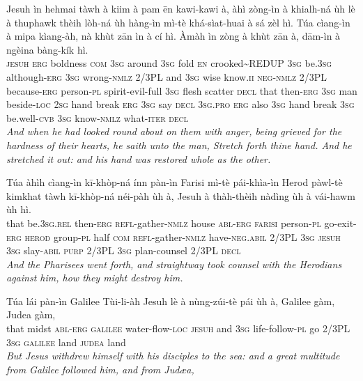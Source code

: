 \documentclass[11pt,a4paper]{article}
\begin{document}
\begin{exe}
\gll Jesuh ìn hehmai tàwh à kiim à pam ēn kawi-kawi à, àhì zòng-ìn à khialh-ná ùh lè à thuphawk thèih lòh-ná ùh hàng-ìn mì-tè khá-sìat-huai à sá zèl hì. Túa cìang-ìn à mipa kìang-àh, nà khùt zān ìn à cí hì. Àmàh ìn zòng à khùt zān à, dām-ìn à ngèina bàng-kík hì. \\
     \textsc{jesuh} \textsc{erg} boldness \textsc{com} \textsc{3sg} around \textsc{3sg} fold \textsc{en} crooked\textasciitilde{}REDUP \textsc{3sg} be.\textsc{3sg} although-\textsc{erg} \textsc{3sg} wrong-\textsc{nmlz} 2/3PL and \textsc{3sg} wise know.\textsc{ii} \textsc{neg}-\textsc{nmlz} 2/3PL because-\textsc{erg} person-\textsc{pl} spirit-evil-full \textsc{3sg} flesh scatter \textsc{decl} that then-\textsc{erg} \textsc{3sg} man beside-\textsc{loc} \textsc{2sg} hand break \textsc{erg} \textsc{3sg} say \textsc{decl} \textsc{3sg}.\textsc{pro} \textsc{erg} also \textsc{3sg} hand break \textsc{3sg} be.well-\textsc{cvb} \textsc{3sg} know-\textsc{nmlz} what-\textsc{iter} \textsc{decl} \\
\glt \textcolor{kjvcolor}{\textit{And when he had looked round about on them with anger, being grieved for the hardness of their hearts, he saith unto the man, Stretch forth thine hand. And he stretched it out: and his hand was restored whole as the other.}}

\gll Túa àhìh cìang-ìn kī-khòp-ná ínn pàn-ìn Farisi mì-tè pái-khìa-ìn Herod pàwl-tè kimkhat tàwh kī-khòp-ná néi-pàh ùh à, Jesuh à thàh-thèih nàdìng ùh à vái-hawm ùh hì. \\
     that be.\textsc{3sg}.\textsc{rel} then-\textsc{erg} \textsc{refl}-gather-\textsc{nmlz} house \textsc{abl}-\textsc{erg} \textsc{farisi} person-\textsc{pl} go-exit-\textsc{erg} \textsc{herod} group-\textsc{pl} half \textsc{com} \textsc{refl}-gather-\textsc{nmlz} have-\textsc{neg}.\textsc{abil} 2/3PL \textsc{3sg} \textsc{jesuh} \textsc{3sg} slay-\textsc{abil} \textsc{purp} 2/3PL \textsc{3sg} plan-counsel 2/3PL \textsc{decl} \\
\glt \textcolor{kjvcolor}{\textit{And the Pharisees went forth, and straightway took counsel with the Herodians against him, how they might destroy him.}}

\gll Túa lái pàn-ìn Galilee Tùi-li-àh Jesuh lè à nùng-zúi-tè pái ùh à, Galilee gàm, Judea gàm, \\
     that midst \textsc{abl}-\textsc{erg} \textsc{galilee} water-flow-\textsc{loc} \textsc{jesuh} and \textsc{3sg} life-follow-\textsc{pl} go 2/3PL \textsc{3sg} \textsc{galilee} land \textsc{judea} land \\
\glt \textcolor{kjvcolor}{\textit{But Jesus withdrew himself with his disciples to the sea: and a great multitude from Galilee followed him, and from Judæa,}}


\end{exe}
\end{document}
